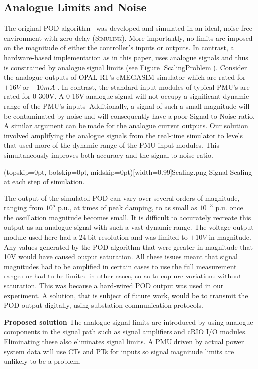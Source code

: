 \documentclass{ieeeaccess}
\begin{document}
\subsection{Analogue Limits and Noise}
The original POD algorithm~\cite{PhasorPOD} was developed and simulated in an ideal, noise-free environment with zero delay (\textsc{Simulink}). More importantly, no limits are imposed on the magnitude of either the controller's inputs or outputs. In contrast, a hardware-based implementation as in this paper, uses analogue signals and thus is constrained by analogue signal limits (see Figure \ref{ScalingProblem}). Consider the analogue outputs of OPAL-RT's eMEGASIM simulator which are rated for $\pm16V$ or $\pm10mA$  \cite{eMEGASIM}. In contrast, the standard input modules of typical PMU's are rated for 0-300V. A 0-16V analogue signal will not occupy a significant dynamic range of the PMU\rq{}s inputs. Additionally, a signal of such a small magnitude will be contaminated by noise and will consequently have a poor Signal-to-Noise ratio. A similar argument can be made for the analogue current outputs. Our solution involved amplifying the analogue signals from the real-time simulator to levels that used more of the dynamic range of the PMU input modules. This simultaneously improves both accuracy and the signal-to-noise ratio.

\Figure[tbp!](topskip=0pt, botskip=0pt, midskip=0pt)[width=0.99\columnwidth]{Scaling.png}
{Signal Scaling at each step of simulation.\label{ScalingProblem}}

The output of the simulated POD can vary over several orders of magnitude, ranging from $10^{5}$ p.u., at times of peak damping, to as small as $10^{-3}$ p.u. once the oscillation magnitude  becomes small. It is difficult to accurately recreate this output as an analogue signal with such a vast dynamic range. The voltage output module used here had a 24-bit resolution and was limited to $\pm 10V$ in magnitude. Any values generated by the POD algorithm that were greater in magnitude that 10V would have caused output saturation. All these issues meant that signal magnitudes had to be amplified in certain cases to use the full measurement ranges or had to be limited in other cases, so as to capture variations without saturation. This was because a hard-wired POD output was used in our experiment. A solution, that is subject of future work,  would be to transmit the POD output digitally, using substation communication protocols.

\textbf{Proposed solution} The analogue signal limits are introduced by using analogue components in the signal path such as signal amplifiers and cRIO I/O modules. Eliminating these also eliminates signal limits. A PMU driven by actual power system data will use CTs and PTs for inputs so signal magnitude limits are unlikely to be a problem.
\end{document}

